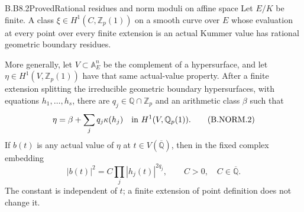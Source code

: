 \begin{claim}{B.B8.2}{Proved}{Rational residues and norm moduli on affine space}
Let $E/K$ be finite.  A class
$\xi\in H^1(C,\mathbb Z_p(1))$ on a smooth curve over $E$ whose
evaluation at every point over every finite extension is an actual
Kummer value has rational geometric boundary residues.

More generally, let $V\subset\mathbb A^n_E$ be the complement
of a hypersurface, and let
$\eta\in H^1(V,\mathbb Z_p(1))$ have that same actual-value
property.  After a finite extension splitting the irreducible
geometric boundary hypersurfaces, with equations $h_1,\ldots,h_s$,
there are $q_j\in\mathbb Q\cap\mathbb Z_p$ and an arithmetic
class $\beta$ such that
\[
 \eta=\beta+\sum_jq_j\kappa(h_j)
       \quad\hbox{in }H^1(V,\mathbb Q_p(1)).               \tag{B.NORM.2}
\]
If $b(t)$ is any actual value of $\eta$ at
$t\in V(\overline{\mathbb Q})$, then in the fixed complex
embedding
\[
 |b(t)|^2=C\prod_j|h_j(t)|^{2q_j},\qquad C>0,\quad
 C\in\overline{\mathbb Q}.                              \tag{B.NORM.3}
\]
The constant is independent of $t$; a finite extension of point
definition does not change it.
\end{claim}
